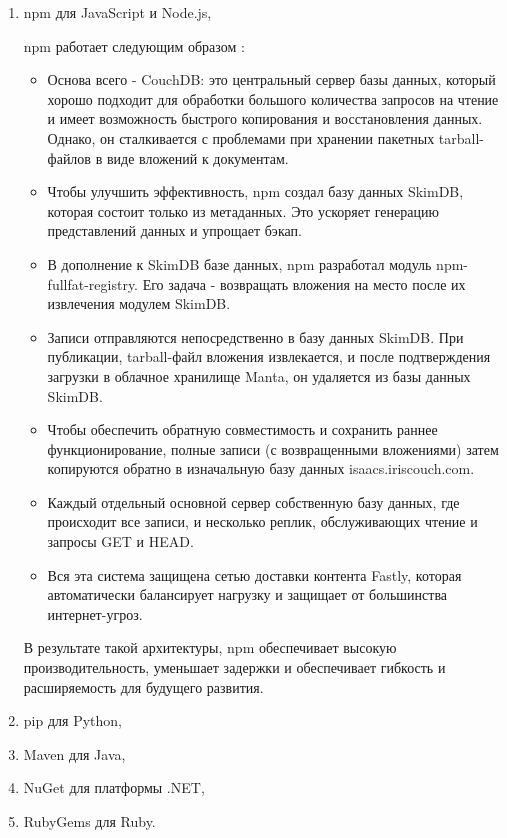 \begin{enumerate}
\item npm \cite{packages:npm} для JavaScript и Node.js,

npm работает следующим образом \cite{arch:npm_moment}:
\begin{itemize}
    \item Основа всего - CouchDB: это центральный сервер базы данных, который хорошо подходит для обработки большого количества запросов на чтение и имеет возможность быстрого копирования и восстановления данных. Однако, он сталкивается с проблемами при хранении пакетных tarball-файлов в виде вложений к документам.
    \item Чтобы улучшить эффективность, npm создал базу данных SkimDB, которая состоит только из метаданных. Это ускоряет генерацию представлений данных и упрощает бэкап.
    \item В дополнение к SkimDB базе данных, npm разработал модуль npm-fullfat-registry. Его задача - возвращать вложения на место после их извлечения модулем SkimDB.
    \item Записи отправляются непосредственно в базу данных SkimDB. При публикации, tarball-файл вложения извлекается, и после подтверждения загрузки в облачное хранилище Manta, он удаляется из базы данных SkimDB.
    \item Чтобы обеспечить обратную совместимость и сохранить раннее функционирование, полные записи (с возвращенными вложениями) затем копируются обратно в изначальную базу данных isaacs.iriscouch.com.
    \item Каждый отдельный основной сервер собственную базу данных, где происходит все записи, и несколько реплик, обслуживающих чтение и запросы GET и HEAD.
    \item Вся эта система защищена сетью доставки контента Fastly, которая автоматически балансирует нагрузку и защищает от большинства интернет-угроз.
\end{itemize}

В результате такой архитектуры, npm обеспечивает высокую производительность, уменьшает задержки и обеспечивает гибкость и расширяемость для будущего развития.

\item pip \cite{packages:pip} для Python,
\item Maven \cite{packages:maven} для Java,
\item NuGet \cite{packages:nuget} для платформы .NET,
\item RubyGems \cite{packages:rubygems} для Ruby.
\end{enumerate}

